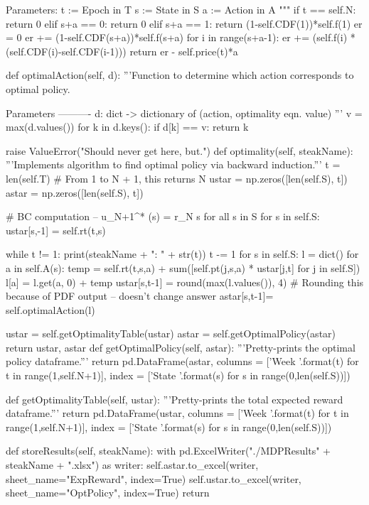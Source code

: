 \documentclass[12pt,a4paper]{article}
\begin{document}
\begin{python}
        Parameters:
        t := Epoch in T
        s := State in S
        a := Action in A
        """
        if t == self.N:
            return 0
        elif s+a == 0:
            return 0
        elif s+a == 1:
            return (1-self.CDF(1))*self.f(1)
        er = 0
        er += (1-self.CDF(s+a))*self.f(s+a)
        for i in range(s+a-1):
            er += (self.f(i) * (self.CDF(i)-self.CDF(i-1)))
        return er - self.price(t)*a
        
        
        
    def optimalAction(self, d):
        '''Function to determine which action corresponds to optimal policy.
        
            Parameters
            ----------
            d: dict -> dictionary of (action, optimality eqn. value) 
        '''
        v = max(d.values())
        for k in d.keys():
            if d[k] == v:
                return k

        raise ValueError("Should never get here, but.")
    def optimality(self, steakName):
        '''Implements algorithm to find optimal policy via backward induction.'''
        t = len(self.T) # From 1 to N + 1, this returns N 
        ustar = np.zeros([len(self.S), t])
        astar = np.zeros([len(self.S), t])
        
        # BC computation -- u_{N+1}^{*} (s) = r_{N} s for all s in S
        for s in self.S:
            ustar[s,-1] = self.rt(t,s)
        
        while t != 1:
            print(steakName + ": " + str(t))
            t -= 1
            for s in self.S:
                l = dict()
                for a in self.A(s):
                    temp = self.rt(t,s,a) + sum([self.pt(j,s,a) * ustar[j,t] for j in self.S])
                    l[a] = l.get(a, 0) + temp
                ustar[s,t-1] = round(max(l.values()), 4) # Rounding this because of PDF output -- doesn't change answer
                astar[s,t-1]= self.optimalAction(l)
        
        ustar = self.getOptimalityTable(ustar)
        astar = self.getOptimalPolicy(astar)
        return ustar, astar
    def getOptimalPolicy(self, astar):
        '''Pretty-prints the optimal policy dataframe.'''
        return pd.DataFrame(astar, 
        columns = ['Week {}'.format(t) for t in 
                   range(1,self.N+1)], 
                   index   = ['State {}'.format(s) 
                   for s in range(0,len(self.S))])
    
    def getOptimalityTable(self, ustar):
        '''Pretty-prints the total expected reward dataframe.'''
        return pd.DataFrame(ustar, columns = 
        ['Week {}'.format(t) for t in range(1,self.N+1)], 
         index   = ['State {}'.format(s) 
         for s in range(0,len(self.S))])
    
    def storeResults(self, steakName):
        with pd.ExcelWriter("./MDPResults" + steakName + ".xlsx") as writer:
            self.astar.to_excel(writer, sheet_name="ExpReward", index=True)
            self.ustar.to_excel(writer, sheet_name="OptPolicy", index=True)
        return
\end{python}
\end{document}
